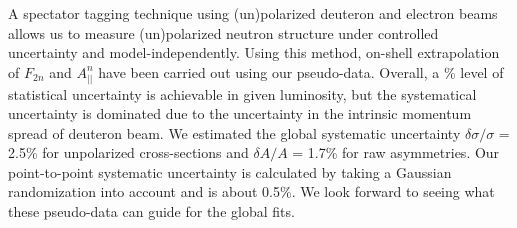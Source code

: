 \documentclass[12pt,letterpaper]{article}
\begin{document}
A spectator tagging technique using (un)polarized deuteron and electron beams allows us to measure (un)polarized neutron structure under controlled uncertainty and model-independently.
Using this method, on-shell extrapolation of $F_{2n}$ and $A^n_{||}$ have been carried out using our pseudo-data.
Overall, a \% level of statistical uncertainty is achievable in given luminosity, but the systematical uncertainty is dominated due to the uncertainty in the intrinsic momentum spread of deuteron beam.
 We estimated the global systematic uncertainty $\delta \sigma/\sigma$ = 2.5\% for unpolarized cross-sections and $\delta A/A$ = 1.7\% for raw asymmetries.  
 Our point-to-point systematic uncertainty is calculated by taking a Gaussian randomization into account and is about 0.5\%.
We look forward to seeing what these pseudo-data can guide for the global fits.  



\end{document}
